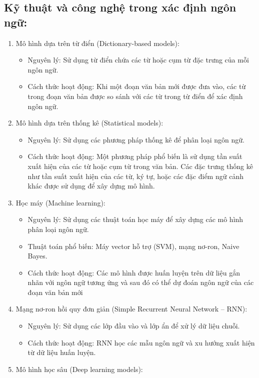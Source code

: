\subsection{Kỹ thuật và công nghệ trong xác định ngôn ngữ:}
\begin{enumerate}
    \item Mô hình dựa trên từ điển (Dictionary-based models):
    \begin{itemize}
        \item Nguyên lý: Sử dụng từ điển chứa các từ hoặc cụm từ đặc trưng của mỗi ngôn ngữ.
        \item Cách thức hoạt động: Khi một đoạn văn bản mới được đưa vào, các từ trong đoạn văn bản được so sánh với các từ trong từ điển để xác định ngôn ngữ.
    \end{itemize}
\item Mô hình dựa trên thống kê (Statistical models):
\begin{itemize}
    \item Nguyên lý: Sử dụng các phương pháp thống kê để phân loại ngôn ngữ.
    \item Cách thức hoạt động: Một phương pháp phổ biến là sử dụng tần suất xuất hiện của các từ hoặc cụm từ trong văn bản. Các đặc trưng thống kê như tần suất xuất hiện của các từ, ký tự, hoặc các đặc điểm ngữ cảnh khác được sử dụng để xây dựng mô hình.
\end{itemize}
\clearpage
\item Học máy (Machine learning):
\begin{itemize}
    \item Nguyên lý: Sử dụng các thuật toán học máy để xây dựng các mô hình phân loại ngôn ngữ.
    \item Thuật toán phổ biến: Máy vector hỗ trợ (SVM), mạng nơ-ron, Naive Bayes.
    \item Cách thức hoạt động: Các mô hình được huấn luyện trên dữ liệu gắn nhãn với ngôn ngữ tương ứng và sau đó có thể dự đoán ngôn ngữ của các đoạn văn bản mới
\end{itemize}
\item Mạng nơ-ron hồi quy đơn giản (Simple Recurrent Neural Network – RNN):
\begin{itemize}
    \item Nguyên lý: Sử dụng các lớp đầu vào và lớp ẩn để xử lý dữ liệu chuỗi.
    \item Cách thức hoạt động: RNN học các mẫu ngôn ngữ và xu hướng xuất hiện từ dữ liệu huấn luyện.
\end{itemize}
\item Mô hình học sâu (Deep learning models):

\end{enumerate}
